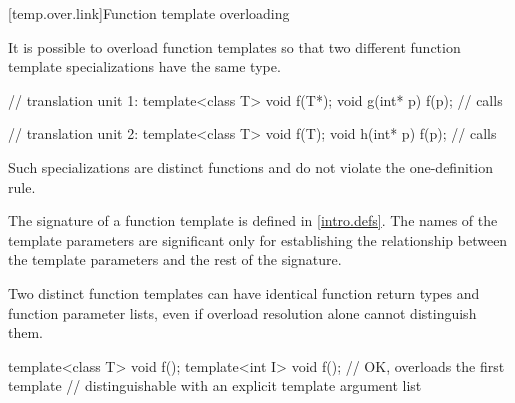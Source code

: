 [temp.over.link]{Function template overloading}

\pnum
{}%
It is possible to overload function templates so that two different
function template specializations have the same type.
\begin{example}

\begin{minipage}{.45\hsize}
\begin{codeblock}
// translation unit 1:
template<class T>
  void f(T*);
void g(int* p) {
  f(p); // calls 
}
\end{codeblock}
\end{minipage}
\begin{minipage}{.45\hsize}
\begin{codeblock}
// translation unit 2:
template<class T>
  void f(T);
void h(int* p) {
  f(p); // calls 
}
\end{codeblock}
\end{minipage}

\end{example}

\pnum
Such specializations are distinct functions and do not violate the one-definition
rule.

\pnum
The signature of a function template
is defined in \ref{intro.defs}.
The names of the template parameters are significant only for establishing
the relationship between the template parameters and the rest of the
signature.
\begin{note}
Two distinct function templates can have identical function return types and
function parameter lists, even if overload resolution alone cannot distinguish
them.

\begin{codeblock}
template<class T> void f();
template<int I> void f();       // OK, overloads the first template
                                // distinguishable with an explicit template argument list
\end{codeblock}
\end{note}


